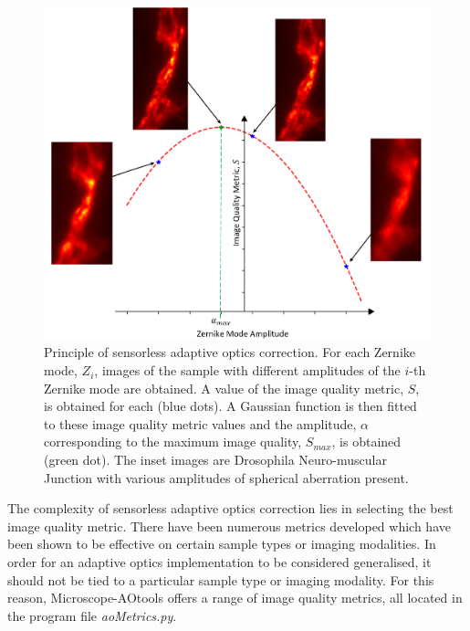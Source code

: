 \begin{figure}
	\centering
	\includegraphics[width=1\textwidth,scale=0.5]{./images/sensorless_aberration_fitting_w_images.png}
	\caption[Principle of sensorless adaptive optics correction.]{Principle of sensorless adaptive optics correction. For each Zernike mode, $Z_i$, images of the sample with different amplitudes of the $i$-th Zernike mode are obtained. A value of the image quality metric, $S$, is obtained for each (blue dots). A Gaussian function is then fitted to these image quality metric values and the amplitude, $\alpha$ corresponding to the maximum image quality, $S_{max}$, is obtained (green dot). The inset images are Drosophila Neuro-muscular Junction with various amplitudes of spherical aberration present.}
	\label{fig:sensorless_correction_method}
\end{figure}

The complexity of sensorless adaptive optics correction lies in
selecting the best image quality metric. There have been numerous
metrics developed which have been shown to be effective on certain
sample types or imaging
modalities\cite{burke2015adaptive,booth2002adaptive,fienup2003aberration,debarre2008adaptive}. In
order for an adaptive optics implementation to be considered
generalised, it should not be tied to a particular sample type or
imaging modality. For this reason, Microscope-AOtools offers a range
of image quality metrics, all located in the program file \textit{aoMetrics.py}.  

